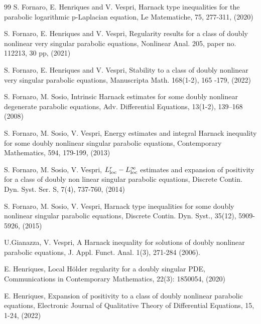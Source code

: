 \documentclass[a4paper,11pt,fullpage]{article}
\numberwithin{equation}{section}
\begin{document}
\begin{thebibliography}{99}
{S. Fornaro, E. Henriques and V. Vespri,} Harnack type inequalities for the parabolic logarithmic p-Laplacian equation,
Le Matematiche, {75}, 277-311, (2020)

{S. Fornaro, E. Henriques and V. Vespri,} Regularity results for a class of doubly nonlinear very singular parabolic equations,
Nonlinear Anal. {205}, paper no. 112213, 30 pp, (2021)

{S. Fornaro, E. Henriques and V. Vespri,} Stability to a class of doubly nonlinear very singular parabolic equations,
Manuscripta Math. {168}(1-2), 165 -179, (2022)


 {S. Fornaro, M. Sosio,} Intrinsic Harnack
estimates for some doubly nonlinear degenerate parabolic equations,
Adv.  Differential Equations, {13}(1-2), 139--168 (2008)

{S. Fornaro, M. Sosio, V. Vespri,} Energy estimates and integral
Harnack inequality for some doubly nonlinear singular parabolic
equations, {Contemporary Mathematics,} {594}, 179-199, (2013)

{S. Fornaro, M. Sosio, V. Vespri,} $L^r_{\rm loc}-L^\infty_{\rm
loc}$ estimates and expansion of positivity for a class of doubly non
linear singular parabolic equations, Discrete Contin. Dyn. Syst. Ser.
S, {7}(4), 737-760, (2014)

{S. Fornaro, M. Sosio, V. Vespri,} Harnack type inequalities for
some doubly nonlinear singular parabolic equations, Discrete Contin.
Dyn. Syst., {35}(12), 5909-5926, (2015)


{U.Gianazza, V. Vespri,} A Harnack inequality for solutions of
doubly nonlinear parabolic equations, J. Appl. Funct. Anal. {1}(3), 271-284 (2006).


E. Henriques, Local H\"{o}lder regularity for a doubly singular PDE,
Communications in Contemporary Mathematics,  {22}(3): 1850054, (2020)

E. Henriques, Expansion of positivity to a class of doubly nonlinear parabolic equations,
 Electronic Journal of Qualitative Theory of Differential Equations, {15}, 1-24, (2022)


\end{thebibliography}
\end{document}
